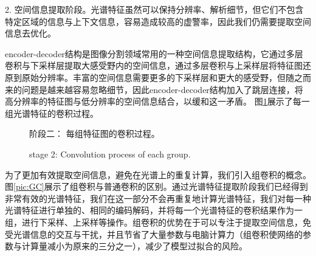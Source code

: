 \documentclass[10pt]{ctexart}
\begin{document}
\begin{multicols}{2}
\begin{table}[H]
    \label{BiomeFlag}
    \end{table}

2. 空间信息提取阶段。光谱特征虽然可以保持分辨率、解析细节，但它们不包含特定区域的信息与上下文信息，容易造成较高的虚警率，因此我们仍需要提取空间信息去优化。

encoder-decoder结构是图像分割领域常用的一种空间信息提取结构，它通过多层卷积与下采样层提取大感受野内的空间信息，通过多层卷积与上采样层将特征图还原到原始分辨率。丰富的空间信息需要更多的下采样层和更大的感受野，但随之而来的问题是越来越容易忽略细节，因此encoder-decoder结构加入了跳层连接，将高分辨率的特征图与低分辨率的空间信息结合，以缓和这一矛盾。
图\ref{pic:part2}展示了每一组光谱特征的卷积过程。

\begin{figure}[H]
    \centering
    \caption[]{阶段二： 每组特征图的卷积过程。}
    \addtocounter{figure}{-1}
    \vspace{-5pt}
    \renewcommand{\figurename}{Fig}
    \caption{stage 2: Convolution process of each group.}
    \renewcommand{\figurename}{图}
    \label{pic:part2}
\end{figure}

为了更加有效提取空间信息，避免在光谱上的重复计算，我们引入组卷积的概念。图\ref{pic:GC}展示了组卷积与普通卷积的区别。通过光谱特征提取阶段我们已经得到非常有效的光谱特征，我们在这一部分不会再重复地计算光谱特征，我们对每一种光谱特征进行单独的、相同的编码解码，并将每一个光谱特征的卷积结果作为一组，进行下采样、上采样等操作。组卷积的优势在于可以专注于提取空间信息，免受光谱信息的交互与干扰，并且节省了大量参数与电脑计算力（组卷积使网络的参数与计算量减小为原来的三分之一），减少了模型过拟合的风险。


\end{multicols}
\end{document}
